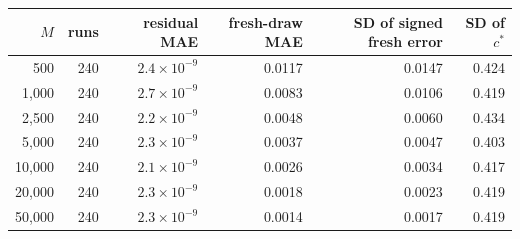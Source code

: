 \setlength{\tabcolsep}{4pt}
\begin{tabular}{rrrrrr}
\hline
$M$ & runs & residual MAE & fresh-draw MAE & SD of signed fresh error & SD of $c^*$ \\
\hline
500 & 240 & $2.4\times10^{-9}$ & 0.0117 & 0.0147 & 0.424 \\
1,000 & 240 & $2.7\times10^{-9}$ & 0.0083 & 0.0106 & 0.419 \\
2,500 & 240 & $2.2\times10^{-9}$ & 0.0048 & 0.0060 & 0.434 \\
5,000 & 240 & $2.3\times10^{-9}$ & 0.0037 & 0.0047 & 0.403 \\
10,000 & 240 & $2.1\times10^{-9}$ & 0.0026 & 0.0034 & 0.417 \\
20,000 & 240 & $2.3\times10^{-9}$ & 0.0018 & 0.0023 & 0.419 \\
50,000 & 240 & $2.3\times10^{-9}$ & 0.0014 & 0.0017 & 0.419 \\
\hline
\end{tabular}
